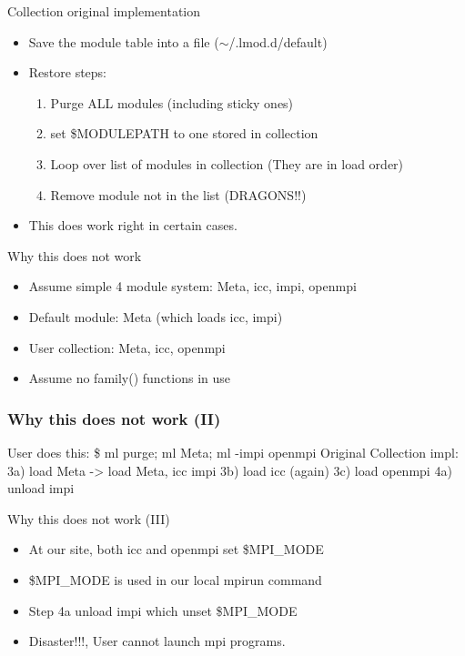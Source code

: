 \documentclass{beamer}
\begin{document}
\begin{frame}{Collection original implementation}
  \begin{itemize}
    \item Save the module table into a file ($\sim$/.lmod.d/default)
    \item Restore steps:
      \begin{enumerate}
        \item Purge ALL modules (including sticky ones)
        \item set \$MODULEPATH to one stored in collection
        \item Loop over list of modules in collection (They are in
          load order)
        \item Remove module not in the list {\color{red} (DRAGONS!!)}
      \end{enumerate}
    \item This does work right in certain cases.
  \end{itemize}
\end{frame}

\begin{frame}{Why this does not work}
  \begin{itemize}
    \item Assume simple 4 module system: Meta, icc, impi, openmpi
    \item Default module: Meta (which loads icc, impi)
    \item User collection: Meta, icc, openmpi
    \item Assume no family() functions in use
  \end{itemize}
\end{frame}

\begin{frame}[fragile]
  \frametitle{Why this does not work (II)}
    {\small
\begin{semiverbatim}
User does this:
   \$ ml purge; ml Meta; ml -impi openmpi
Original Collection impl:
   3a) load Meta -> load Meta, icc impi
   3b) load icc (again)
   3c) load openmpi
   4a) unload impi
\end{semiverbatim}
    }
\end{frame}

\begin{frame}{Why this does not work (III)}
  \begin{itemize}
    \item At our site, both icc and openmpi set \$MPI\_MODE
    \item \$MPI\_MODE is used in our local mpirun command
    \item Step 4a unload impi which unset \$MPI\_MODE
    \item Disaster!!!, User cannot launch mpi programs.
  \end{itemize}
\end{frame}
\end{document}
